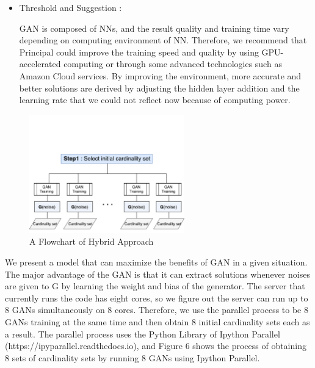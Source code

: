 \documentclass[11pt]{article}
\begin{document}
\begin{itemize}
\begin{itemize}
	 \item Threshold and Suggestion :
	 
	 GAN is composed of NNs, and the result quality and training time vary depending on computing environment of NN. Therefore, we recommend that Principal could improve the training speed and quality by using GPU-accelerated computing or through some advanced technologies such as Amazon Cloud services. By improving the environment, more accurate and better solutions are derived by adjusting the hidden layer addition and the learning rate that we could not reflect now because of computing power. 
 
 	 \end{itemize}
 
 
 
\begin{figure}[h] 
	\begin{center}
		\includegraphics[width=0.6\textwidth]{step1}
		\caption{A Flowchart of Hybrid Approach} \label{fig:step1}
	\end{center}
\end{figure}


	We present a model that can maximize the benefits of GAN in a given situation. The major advantage of the GAN is that it can extract solutions whenever noises are given to G by learning the weight and bias of the generator.
	The server that currently runs the code has eight cores, so we figure out the server can run up to 8 GANs simultaneously on 8 cores. Therefore, we use the parallel process to be 8 GANs training at the same time and then obtain 8 initial cardinality sets each as a result. The parallel process uses the Python Library of Ipython Parallel (https://ipyparallel.readthedocs.io), and Figure 6 shows the process of obtaining 8 sets of cardinality sets by running 8 GANs using Ipython Parallel.


\end{itemize}
\end{document}
